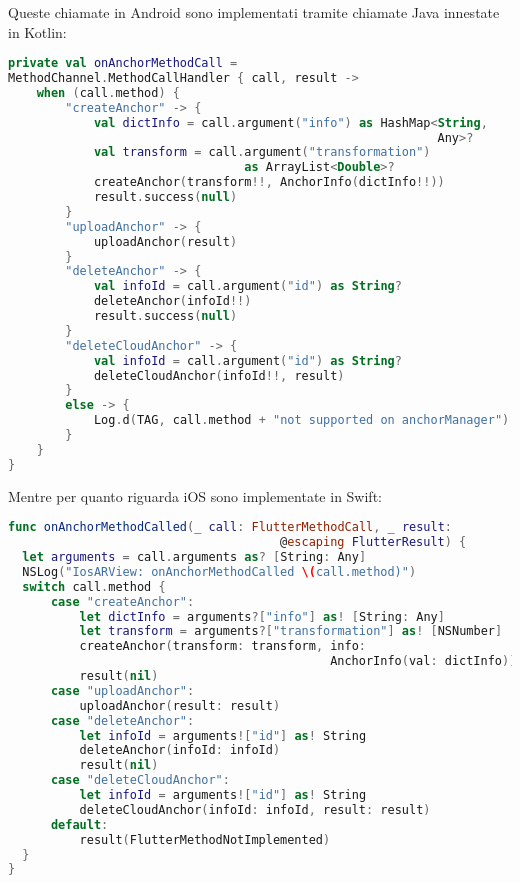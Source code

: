 Queste chiamate in Android sono implementati tramite chiamate Java innestate in Kotlin:

\begin{lstlisting}[language=Kotlin, label={lst:android_channels}, firstnumber=1,caption={Android chiamate dei \textit{method channel} per effettuare \textit{create, delete, ulpoad, delete cloud anchor} tramite \textit{method channel}}]
private val onAnchorMethodCall =
MethodChannel.MethodCallHandler { call, result ->
    when (call.method) {
        "createAnchor" -> {
            val dictInfo = call.argument("info") as HashMap<String,
                                                            Any>?
            val transform = call.argument("transformation") 
                                 as ArrayList<Double>?
            createAnchor(transform!!, AnchorInfo(dictInfo!!))
            result.success(null)
        }
        "uploadAnchor" -> {
            uploadAnchor(result)
        }
        "deleteAnchor" -> {
            val infoId = call.argument("id") as String?
            deleteAnchor(infoId!!)
            result.success(null)
        }
        "deleteCloudAnchor" -> {
            val infoId = call.argument("id") as String?
            deleteCloudAnchor(infoId!!, result)
        }
        else -> {
            Log.d(TAG, call.method + "not supported on anchorManager")
        }
    }
}
\end{lstlisting}

Mentre per quanto riguarda iOS sono implementate in Swift:

\begin{lstlisting}[language=swift, label={lst:ios_channels}, firstnumber=1,caption={iOS chiamate dei \textit{method channel} per effettuare \textit{create, delete, ulpoad, delete cloud anchor}}]
func onAnchorMethodCalled(_ call: FlutterMethodCall, _ result: 
                                      @escaping FlutterResult) {
  let arguments = call.arguments as? [String: Any]
  NSLog("IosARView: onAnchorMethodCalled \(call.method)")
  switch call.method {
      case "createAnchor":
          let dictInfo = arguments?["info"] as! [String: Any]
          let transform = arguments?["transformation"] as! [NSNumber]
          createAnchor(transform: transform, info: 
                                             AnchorInfo(val: dictInfo))
          result(nil)
      case "uploadAnchor":
          uploadAnchor(result: result)
      case "deleteAnchor":
          let infoId = arguments!["id"] as! String
          deleteAnchor(infoId: infoId)
          result(nil)
      case "deleteCloudAnchor":
          let infoId = arguments!["id"] as! String
          deleteCloudAnchor(infoId: infoId, result: result)
      default:
          result(FlutterMethodNotImplemented)
  }
}
\end{lstlisting}

